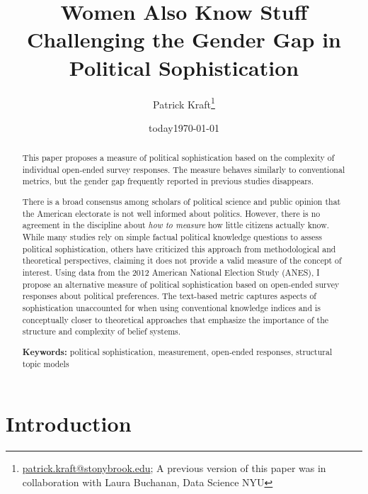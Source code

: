 \documentclass[12pt]{article}
\author{Patrick Kraft\footnote{\href{mailto:patrick.kraft@stonybrook.edu}{patrick.kraft@stonybrook.edu}; A previous version of this paper was in collaboration with Laura Buchanan, Data Science NYU}}
\date{today}
\title{Women Also Know Stuff\\
\large{Challenging the Gender Gap in Political Sophistication}}
\date{\today}
\begin{document}
\maketitle\doublespacing\thispagestyle{empty}

\begin{abstract}
This paper proposes a measure of political sophistication based on the complexity of individual open-ended survey responses. The measure behaves similarly to conventional metrics, but the gender gap frequently reported in previous studies disappears.


There is a broad consensus among scholars of political science and public opinion that the American electorate is not well informed about politics. However, there is no agreement in the discipline about \textit{how to measure} how little citizens actually know. While many studies rely on simple factual political knowledge questions to assess political sophistication, others have criticized this approach from methodological and theoretical perspectives, claiming it does not provide a valid measure of the concept of interest. Using data from the 2012 American National Election Study (ANES), I propose an alternative measure of political sophistication based on open-ended survey responses about political preferences. The text-based metric captures aspects of sophistication unaccounted for when using conventional knowledge indices and is conceptually closer to theoretical approaches that emphasize the importance of the structure and complexity of belief systems.

\vspace{\baselineskip}
\noindent \textbf{Keywords:} political sophistication, measurement, open-ended responses, structural topic models \\

\end{abstract}
\newpage\setcounter{page}{1}


\section*{Introduction}
\end{document}
